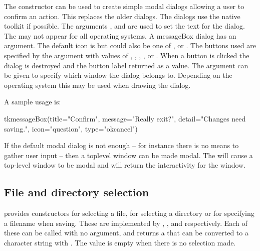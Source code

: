 The  constructor can be used to create 
simple modal dialogs allowing a user to confirm an action. This
replaces the older  dialogs. The 
dialogs use the native toolkit if possible. The arguments
,  and
 are used to set the text for the
dialog. The  may not appear for all operating systems. A
messageBox dialog has an  argument. The
default icon is  but could also be one of ,
 or . The buttons used are specified by
the  argument with values of ,
, , , or
. When a button is clicked the dialog is destroyed
and the button label returned as a value. The argument
 can be given to specify which window
the dialog belongs to. Depending on the operating system this may be
used when drawing the dialog.

A sample usage is:
\begin{Schunk}
\begin{Sinput}
 tkmessageBox(title="Confirm", message="Really exit?", 
              detail="Changes need saving.", 
              icon="question", type="okcancel")
\end{Sinput}
\end{Schunk}
If the default modal dialog is not enough -- for instance there is no
means to gather user input -- then a toplevel window can be made
modal. The  will cause a top-level window to
be modal and  will return the interactivity
for the window.

\subsection{File and directory selection}
\label{sec:file-direct-select}

\Tk\/ provides constructors for selecting a file, for selecting a
directory or for specifying a filename when saving. These are
implemented by ,
, and 
respectively. Each of these can be called with no argument, and
returns a  that can be converted to a character string
with . The value is empty when there is no selection made.

